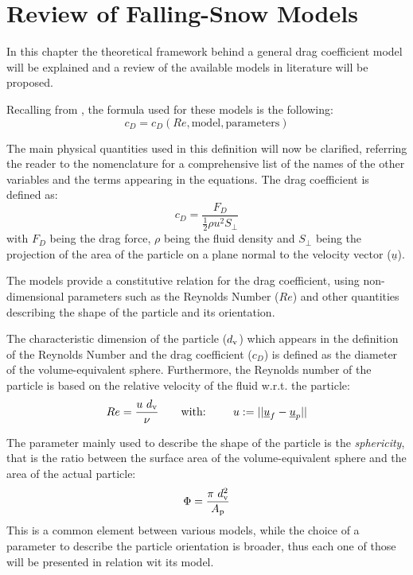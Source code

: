 
\chapter{Review of Falling-Snow Models}
	In this chapter the theoretical framework behind a general drag coefficient model will be explained and a review of the available models in literature will be proposed. 
	
	Recalling from , the formula used for these models is the following:
	\begin{equation}
		c_D = c_D(Re, \text{model}, \text{parameters})
	\end{equation}
	
	The main physical quantities used in this definition will now be clarified, referring the reader to the nomenclature for a comprehensive list of the names of the other variables and the terms appearing in the equations.
	The drag coefficient is defined as:
	\begin{equation}
		c_D = \dfrac{F_D}{\frac{1}{2} \rho u^2 S_{\perp}}
	\end{equation}
	with $ F_D $ being the drag force, $ \rho $ being the fluid density and $ S_{\perp} $ being the projection of the area of the particle on a plane normal to the velocity vector ($ \underline{u} $).
	
	The models provide a constitutive relation for the drag coefficient, using non-dimensional parameters such as the Reynolds Number ($ Re $) and other quantities describing the shape of the particle and its orientation.
	 
	The characteristic dimension of the particle ($ d_{\textup{v}} $) which appears in the definition of the Reynolds Number and the drag coefficient ($ c_D $) is defined as the diameter of the volume-equivalent sphere. Furthermore, the Reynolds number of the particle is based on the relative velocity of the fluid w.r.t. the particle:
	\begin{equation}
		Re = \dfrac{u \ d_{\textup{v}}}{\nu} \qquad \text{with: } \qquad u := || \underline{u}_f - \underline{u}_p ||
	\end{equation}

	The parameter mainly used to describe the shape of the particle is the \textit{sphericity}, that is the ratio between the surface area of the
	volume-equivalent sphere and the area of the actual particle:
	\begin{equation}
		\Phi = \dfrac{\pi \ d_{\textup{v}}^2} {A_{\textup{p}}}
	\end{equation}
	This is a common element between various models, while the choice of a parameter to describe the particle orientation is broader, thus each one of those will be presented in relation wit its model.
	
